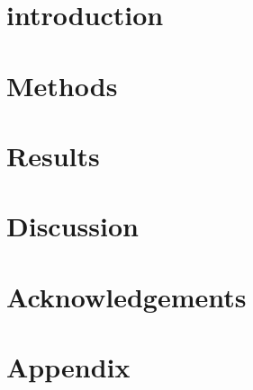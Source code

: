 \documentclass[12pt, a4paper, twoside]{report}
\title{}
\author{}
\date{\today}
\begin{document}
 



 
\tableofcontents

\listoffigures

\listoftables


\chapter{introduction}


\chapter{Methods}


\chapter{Results}


\chapter{Discussion}


\chapter{Acknowledgements}


\appendix
\chapter{Appendix}


\printbibliography
\end{document}
